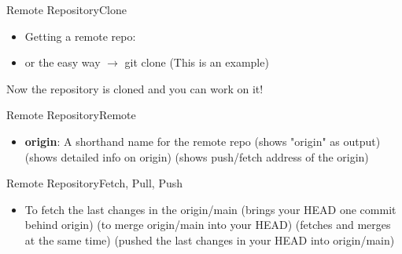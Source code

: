 \begin{frame}{Remote Repository}{Clone}
  \begin{itemize}
  \item Getting a remote repo:
  \end{itemize}
  \begin{itemize}
  \item or the easy way $\rightarrow$ git clone
     (This is an example)
  \end{itemize}
  Now the repository is cloned and you can work on it!
\end{frame}
\begin{frame}{Remote Repository}{Remote}
  \begin{itemize}
    \item \textbf{origin}: A shorthand name for the remote repo
       (shows "origin" as output)
       (shows detailed info on origin)
       (shows push/fetch address of the origin)
  \end{itemize}
\end{frame}
\begin{frame}{Remote Repository}{Fetch, Pull, Push}
  \begin{itemize}
\item To fetch the last changes in the origin/main
      (brings  your HEAD one commit behind origin)
 (to merge origin/main into your HEAD)
 (fetches and merges at the same time)
   (pushed the last changes in your HEAD into origin/main)
  \end{itemize}
\end{frame}
